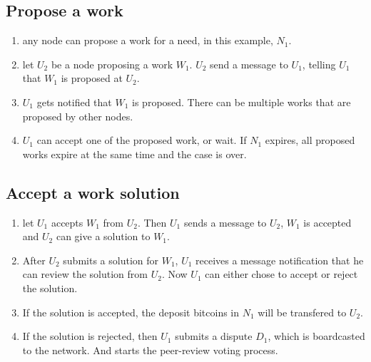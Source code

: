 \documentclass[12pt]{article}
\begin{document}
\subsection{Propose a work}
\begin{enumerate}
	\item any node can propose a work for a need, in this example, $N_1$. 
	\item let $U_2$ be a node proposing a work $W_1$. $U_2$ send a message to $U_1$, telling $U_1$ that $W_1$ is proposed at $U_2$.
	\item $U_1$ gets notified that $W_1$ is proposed. There can be multiple works that are proposed by other nodes. 
	\item $U_1$ can accept one of the proposed work, or wait. If $N_1$ expires, all proposed works expire at the same time and the case is over.
\end{enumerate}

\subsection{Accept a work solution}
\begin{enumerate}
	\item let $U_1$ accepts $W_1$ from $U_2$. Then $U_1$ sends a message to $U_2$, $W_1$ is accepted and $U_2$ can give a solution to $W_1$.
	\item After $U_2$ submits a solution for $W_1$, $U_1$ receives a message notification that he can review the solution from $U_2$. Now $U_1$ can either chose to accept or reject the solution.
	\item If the solution is accepted, the deposit bitcoins in $N_1$ will be transfered to $U_2$.
	\item If the solution is rejected, then $U_1$ submits a dispute $D_1$, which is boardcasted to the network. And starts the peer-review voting process.
\end{enumerate}

\begin{thebibliography}{9}

\end{thebibliography}

	
\end{document}
